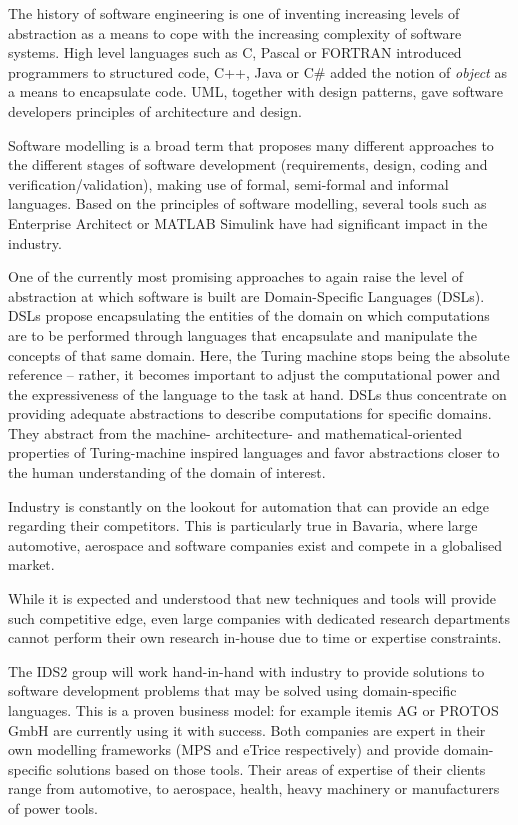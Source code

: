 \documentclass{article}
\begin{document}
The history of software engineering is one of inventing increasing levels of
abstraction as a means to cope with the increasing complexity of software
systems. High level languages such as C, Pascal or FORTRAN introduced
programmers to structured code, C++, Java or C\# added the notion of
\emph{object} as a means to encapsulate code. UML, together with design
patterns, gave software developers principles of architecture and design.

Software modelling is a broad term that proposes many different approaches to the different stages
of software development (requirements, design, coding and
verification/validation), making use of formal, semi-formal and informal
languages. Based on the principles of software modelling, several tools such as
Enterprise Architect or MATLAB Simulink have had significant impact in the
industry.

One of the currently most promising approaches to again raise the level of
abstraction at which software is built are Domain-Specific Languages (DSLs).
DSLs propose encapsulating the entities of the domain on which computations are
to be performed through languages that encapsulate and manipulate the concepts
of that same domain. Here, the Turing machine stops being the absolute reference
-- rather, it becomes important to adjust the computational power and the
expressiveness of the language to the task at hand. DSLs thus concentrate on
providing adequate abstractions to describe computations for specific domains. They abstract from the machine-
architecture- and mathematical-oriented properties of Turing-machine inspired
languages and favor abstractions closer to the human understanding of the domain
of interest.

Industry is constantly on the lookout for automation that can provide an edge
regarding their competitors. This is particularly true in Bavaria, where large
automotive, aerospace and software companies exist and compete in a globalised
market.

While it is expected and understood that new techniques and tools will provide
such competitive edge, even large companies with dedicated research departments
cannot perform their own research in-house due to time or expertise constraints.

The IDS2 group will work hand-in-hand with industry to provide solutions to
software development problems that may be solved using domain-specific
languages. This is a proven business model: for example itemis AG or PROTOS GmbH
are currently using it with success. Both companies are expert in
their own modelling frameworks (MPS and eTrice respectively) and provide domain-specific
solutions based on those tools. Their areas of expertise of their clients range
from automotive, to aerospace, health, heavy machinery or manufacturers of power
tools.
\end{document}
